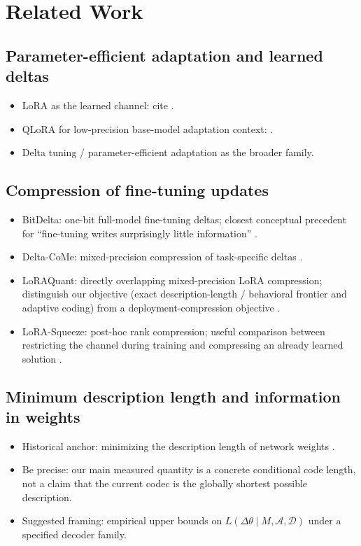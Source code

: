 \documentclass[10pt]{article}
\newcommand{\paperidea}[1]{\item #1}
\begin{document}
\section{Related Work}
\subsection{Parameter-efficient adaptation and learned deltas}
\begin{itemize}
  \paperidea{LoRA as the learned channel: cite \citet{hu2021lora}.}
  \paperidea{QLoRA for low-precision base-model adaptation context: \citet{dettmers2023qlora}.}
  \paperidea{Delta tuning / parameter-efficient adaptation as the broader family.}
\end{itemize}

\subsection{Compression of fine-tuning updates}
\begin{itemize}
  \paperidea{BitDelta: one-bit full-model fine-tuning deltas; closest conceptual precedent for ``fine-tuning writes surprisingly little information'' \citep{liu2024bitdelta}.}
  \paperidea{Delta-CoMe: mixed-precision compression of task-specific deltas \citep{ping2024deltacome}.}
  \paperidea{LoRAQuant: directly overlapping mixed-precision LoRA compression; distinguish our objective (exact description-length / behavioral frontier and adaptive coding) from a deployment-compression objective \citep{mirzaei2025loraquant}.}
  \paperidea{LoRA-Squeeze: post-hoc rank compression; useful comparison between restricting the channel during training and compressing an already learned solution \citep{vulic2026lorasqueeze}.}
\end{itemize}

\subsection{Minimum description length and information in weights}
\begin{itemize}
  \paperidea{Historical anchor: minimizing the description length of network weights \citep{hinton1993mdl}.}
  \paperidea{Be precise: our main measured quantity is a concrete conditional code length, not a claim that the current codec is the globally shortest possible description.}
  \paperidea{Suggested framing: empirical upper bounds on $L(\Delta\theta\mid M,\mathcal A,\mathcal D)$ under a specified decoder family.}
\end{itemize}
\end{document}
